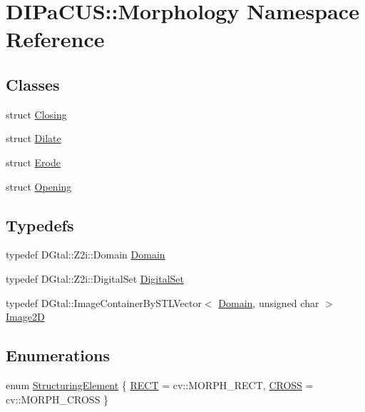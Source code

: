 \hypertarget{namespaceDIPaCUS_1_1Morphology}{}\section{D\+I\+Pa\+C\+US\+:\+:Morphology Namespace Reference}
\label{namespaceDIPaCUS_1_1Morphology}
\subsection*{Classes}
\begin{DoxyCompactItemize}
\item 
struct \mbox{\hyperlink{structDIPaCUS_1_1Morphology_1_1Closing}{Closing}}
\item 
struct \mbox{\hyperlink{structDIPaCUS_1_1Morphology_1_1Dilate}{Dilate}}
\item 
struct \mbox{\hyperlink{structDIPaCUS_1_1Morphology_1_1Erode}{Erode}}
\item 
struct \mbox{\hyperlink{structDIPaCUS_1_1Morphology_1_1Opening}{Opening}}
\end{DoxyCompactItemize}
\subsection*{Typedefs}
\begin{DoxyCompactItemize}
\item 
typedef D\+Gtal\+::\+Z2i\+::\+Domain \mbox{\hyperlink{namespaceDIPaCUS_1_1Morphology_ab9f5fc1118b80b969855f77bee7d9914}{Domain}}
\item 
typedef D\+Gtal\+::\+Z2i\+::\+Digital\+Set \mbox{\hyperlink{namespaceDIPaCUS_1_1Morphology_ab69fa725716b0ed4c311c0d00a292be7}{Digital\+Set}}
\item 
typedef D\+Gtal\+::\+Image\+Container\+By\+S\+T\+L\+Vector$<$ \mbox{\hyperlink{namespaceDIPaCUS_1_1Morphology_ab9f5fc1118b80b969855f77bee7d9914}{Domain}}, unsigned char $>$ \mbox{\hyperlink{namespaceDIPaCUS_1_1Morphology_a9aff9edf28d681accfc54435fbefcbee}{Image2D}}
\end{DoxyCompactItemize}
\subsection*{Enumerations}
\begin{DoxyCompactItemize}
\item 
enum \mbox{\hyperlink{namespaceDIPaCUS_1_1Morphology_a60b552d68432e7992f09717070d9c4e7}{Structuring\+Element}} \{ \mbox{\hyperlink{namespaceDIPaCUS_1_1Morphology_a60b552d68432e7992f09717070d9c4e7a5ba2c6c1635185268d1540bd2075da3c}{R\+E\+CT}} = cv\+:\+:M\+O\+R\+P\+H\+\_\+\+R\+E\+CT, 
\mbox{\hyperlink{namespaceDIPaCUS_1_1Morphology_a60b552d68432e7992f09717070d9c4e7a7269c26cd97a608362be8ecdda8280e5}{C\+R\+O\+SS}} = cv\+:\+:M\+O\+R\+P\+H\+\_\+\+C\+R\+O\+SS
 \}
\end{DoxyCompactItemize}
